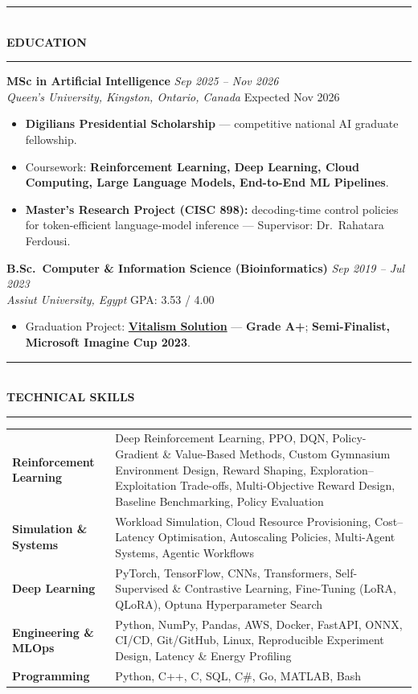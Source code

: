 \documentclass[10pt, a4paper]{article}
\newcommand{\cvsection}[1]{%
  \vspace{3pt}%
  {\color{navy}\rule{\linewidth}{1.1pt}}\\[0.5pt]%
  {\color{navy}\bfseries\fontsize{9.5}{11}\selectfont\uppercase{#1}}\\[-4pt]%
  {\color{teal}\rule{\linewidth}{0.6pt}}%
  \vspace{2pt}%
}
\newcommand{\cventry}[4]{%
  \vspace{2.5pt}%
  \textbf{\color{darkgray}#1} \hfill {\color{midgray}\textit{#3}}\\[-1.5pt]%
  {\color{teal}\textit{#2}} \hfill {\color{midgray}#4}%
}
\newenvironment{cvitems}{%
  \begin{itemize}[leftmargin=11pt, itemsep=0.5pt, parsep=0pt, topsep=1pt,
                  label={\textcolor{teal}{$\bullet$}}]
}{%
  \end{itemize}%
}
\begin{document}
\cvsection{Education}

\cventry{MSc in Artificial Intelligence}{Queen's University, Kingston, Ontario, Canada}
        {Sep 2025 -- Nov 2026}{Expected Nov 2026}
\begin{cvitems}
  \item \textbf{Digilians Presidential Scholarship} --- competitive national AI graduate fellowship.
  \item Coursework: \textbf{Reinforcement Learning, Deep Learning, Cloud Computing, Large Language Models, End-to-End ML Pipelines}.
  \item \textbf{Master's Research Project (CISC 898):} decoding-time control policies for token-efficient language-model inference --- Supervisor: Dr.\ Rahatara Ferdousi.
\end{cvitems}

\cventry{B.Sc.\ Computer \& Information Science (Bioinformatics)}{Assiut University, Egypt}
        {Sep 2019 -- Jul 2023}{GPA: 3.53 / 4.00}
\begin{cvitems}
  \item Graduation Project: \href{https://vitalismsolution.github.io/}{\textbf{Vitalism Solution}} --- \textbf{Grade A+}; \textbf{Semi-Finalist, Microsoft Imagine Cup 2023}.
\end{cvitems}

\cvsection{Technical Skills}

\renewcommand{\arraystretch}{1.1}
\begin{tabularx}{\linewidth}{@{}>{\raggedright\hyphenpenalty=10000\arraybackslash}p{35mm} X@{}}
\textbf{Reinforcement Learning} &
Deep Reinforcement Learning, PPO, DQN, Policy-Gradient \& Value-Based Methods, Custom Gymnasium Environment Design, Reward Shaping, Exploration--Exploitation Trade-offs, Multi-Objective Reward Design, Baseline Benchmarking, Policy Evaluation \\

\textbf{Simulation \& Systems} &
Workload Simulation, Cloud Resource Provisioning, Cost--Latency Optimisation, Autoscaling Policies, Multi-Agent Systems, Agentic Workflows \\

\textbf{Deep Learning} &
PyTorch, TensorFlow, CNNs, Transformers, Self-Supervised \& Contrastive Learning, Fine-Tuning (LoRA, QLoRA), Optuna Hyperparameter Search \\

\textbf{Engineering \& MLOps} &
Python, NumPy, Pandas, AWS, Docker, FastAPI, ONNX, CI/CD, Git/GitHub, Linux, Reproducible Experiment Design, Latency \& Energy Profiling \\

\textbf{Programming} &
Python, C++, C, SQL, C\#, Go, MATLAB, Bash \\
\end{tabularx}
\end{document}
